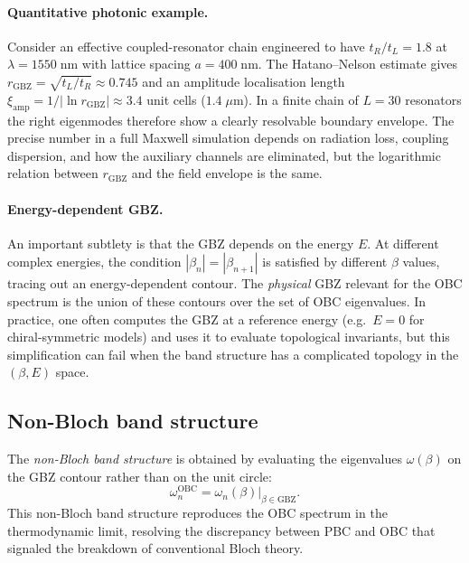 \paragraph{Quantitative photonic example.}
Consider an effective coupled-resonator chain engineered to have
$t_R/t_L=1.8$ at $\lambda=1550\;\mathrm{nm}$ with lattice spacing
$a=400\;\mathrm{nm}$. The Hatano--Nelson estimate gives
$r_{\mathrm{GBZ}}=\sqrt{t_L/t_R}\approx0.745$ and an amplitude
localisation length
$\xi_{\mathrm{amp}}=1/|\ln r_{\mathrm{GBZ}}|\approx3.4$ unit cells
($1.4\;\mu\mathrm{m}$). In a finite chain of $L=30$ resonators the
right eigenmodes therefore show a clearly resolvable boundary envelope.
The precise number in a full Maxwell simulation depends on radiation
loss, coupling dispersion, and how the auxiliary channels are eliminated,
but the logarithmic relation between $r_{\mathrm{GBZ}}$ and the field
envelope is the same.

\paragraph{Energy-dependent GBZ.}
An important subtlety is that the GBZ depends on the energy $E$.
At different complex energies, the condition
$|\beta_n| = |\beta_{n+1}|$ is satisfied by different $\beta$ values,
tracing out an energy-dependent contour. The \emph{physical} GBZ
relevant for the OBC spectrum is the union of these contours over the
set of OBC eigenvalues. In practice, one often computes the GBZ at a
reference energy (e.g.\ $E = 0$ for chiral-symmetric models) and uses
it to evaluate topological invariants, but this simplification can
fail when the band structure has a complicated topology in the
$(\beta, E)$ space.

\subsection{Non-Bloch band structure}
\label{ssec:non-bloch-bands}

The \emph{non-Bloch band structure} is obtained by evaluating the
eigenvalues $\omega(\beta)$ on the GBZ contour rather than on the unit
circle:
\begin{equation}
 \omega_n^{\mathrm{OBC}} = \omega_n(\beta)\big|_{\beta \in \mathrm{GBZ}}.
 \label{eq:non-bloch-bands}
\end{equation}
This non-Bloch band structure reproduces the OBC spectrum in the
thermodynamic limit, resolving the discrepancy between PBC and OBC that
signaled the breakdown of conventional Bloch theory.


